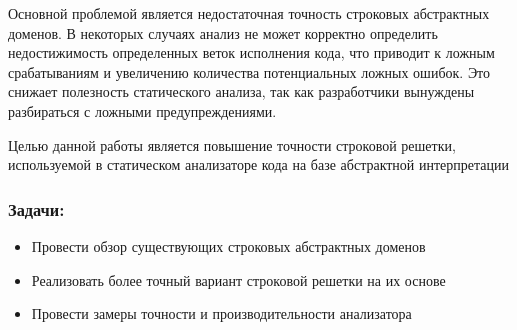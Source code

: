 Основной проблемой является недостаточная точность строковых абстрактных доменов. В некоторых случаях анализ не может корректно определить недостижимость определенных веток исполнения кода, что приводит к ложным срабатываниям и увеличению количества потенциальных ложных ошибок. Это снижает полезность статического анализа, так как разработчики вынуждены разбираться с ложными предупреждениями.

Целью данной работы является повышение точности строковой решетки, используемой в статическом анализаторе кода на базе абстрактной интерпретации

\subsubsection*{Задачи:}

\begin{itemize}
\item Провести обзор существующих строковых абстрактных доменов
\item Реализовать более точный вариант строковой решетки на их основе
\item Провести замеры точности и производительности анализатора
\end{itemize}

\newpage
